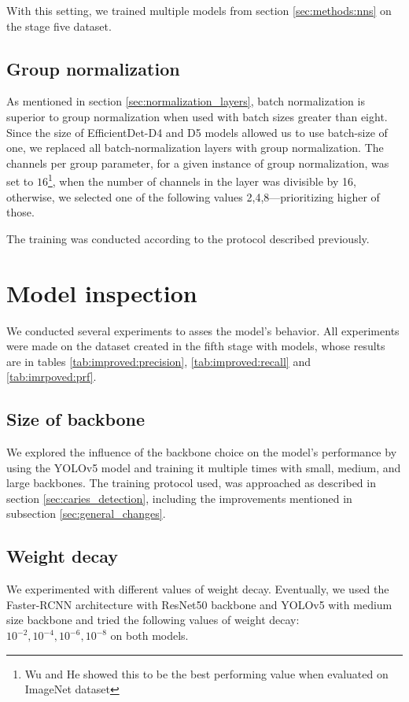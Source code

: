 With this setting, we trained multiple models from section \ref{sec:methods:nns} on the stage five dataset.

\subsection{Group normalization}
\label{sec:methods:group_norm}
As mentioned in section \ref{sec:normalization_layers}, batch normalization is superior to group normalization when used with batch sizes greater than eight. Since the size of EfficientDet-D4 and D5  models allowed us to use batch-size of one, we replaced all batch-normalization layers with group normalization. The channels per group parameter, for a given instance of group normalization, was set to $16$\footnote{Wu and He \cite{Wu2018} showed this to be the best performing value when evaluated on ImageNet dataset}, when the number of channels in the layer was divisible by 16, otherwise, we selected one of the following values 2,4,8—prioritizing higher of those.

The training was conducted according to the protocol described previously.


\section{Model inspection}
\label{sec:model_inspection}
We conducted several experiments to asses the model's behavior. All experiments were made on the dataset created in the fifth stage with models, whose results are in tables \ref{tab:improved:precision}, \ref{tab:improved:recall} and \ref{tab:imrpoved:prf}.

\subsection{Size of backbone}
We explored the influence of the backbone choice on the model's performance by using the YOLOv5 model and training it multiple times with small, medium, and large backbones. The training protocol used,  was approached as described in section \ref{sec:caries_detection}, including the improvements mentioned in subsection \ref{sec:general_changes}.

\subsection{Weight decay}
We experimented with different values of weight decay. Eventually, we used the Faster-RCNN architecture with ResNet50 backbone and YOLOv5 with medium size backbone and tried the following values of weight decay: $10^{-2}, 10^{-4}, 10^{-6}, 10^{-8}$ on both models.



